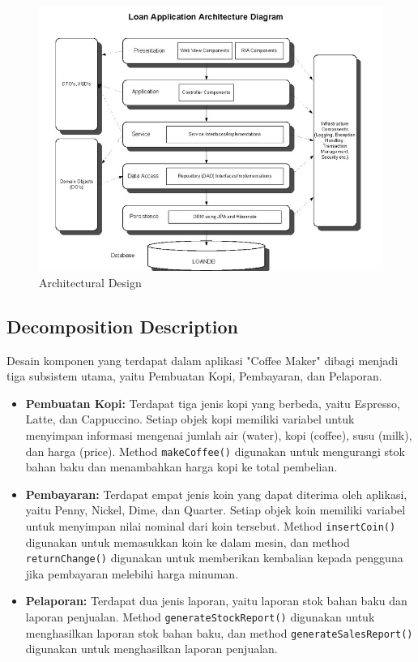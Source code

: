 \documentclass[12pt]{article}
\begin{document}
\begin{figure}[tbh]
\centering
\includegraphics[width=0.7\linewidth]{./img/image}
\caption{Architectural Design}
\label{fig:image}
\end{figure}


\subsection{Decomposition Description}
Desain komponen yang terdapat dalam aplikasi "Coffee Maker" dibagi menjadi tiga subsistem utama, yaitu Pembuatan Kopi, Pembayaran, dan Pelaporan.

\begin{itemize}
\item \textbf{Pembuatan Kopi:} Terdapat tiga jenis kopi yang berbeda, yaitu Espresso, Latte, dan Cappuccino. Setiap objek kopi memiliki variabel untuk menyimpan informasi mengenai jumlah air (water), kopi (coffee), susu (milk), dan harga (price). Method \texttt{makeCoffee()} digunakan untuk mengurangi stok bahan baku dan menambahkan harga kopi ke total pembelian.    
\item \textbf{Pembayaran:} Terdapat empat jenis koin yang dapat diterima oleh aplikasi, yaitu Penny, Nickel, Dime, dan Quarter. Setiap objek koin memiliki variabel untuk menyimpan nilai nominal dari koin tersebut. Method \texttt{insertCoin()} digunakan untuk memasukkan koin ke dalam mesin, dan method \texttt{returnChange()} digunakan untuk memberikan kembalian kepada pengguna jika pembayaran melebihi harga minuman.
\item \textbf{Pelaporan:} Terdapat dua jenis laporan, yaitu laporan stok bahan baku dan laporan penjualan. Method \texttt{generateStockReport()} digunakan untuk menghasilkan laporan stok bahan baku, dan method \texttt{generateSalesReport()} digunakan untuk menghasilkan laporan penjualan.
\end{itemize}
\end{document}
